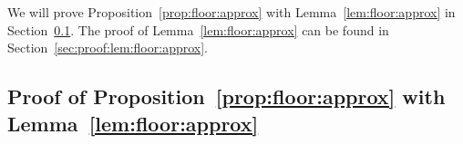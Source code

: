 \documentclass[nohyperref]{article}
\theoremstyle{plain}
\newtheorem{proposition}[theorem]{Proposition}
\theoremstyle{definition}
\theoremstyle{remark}
\begin{document}

We will prove
Proposition~\ref{prop:floor:approx} with Lemma~\ref{lem:floor:approx} in Section~\ref{sec:proof:prop:floor:approx:with:lemma}.
The proof of Lemma~\ref{lem:floor:approx} can be found in Section~\ref{sec:proof:lem:floor:approx}. 

\subsection{Proof of Proposition~\ref{prop:floor:approx} with Lemma~\ref{lem:floor:approx}}
\label{sec:proof:prop:floor:approx:with:lemma}
\end{document}
